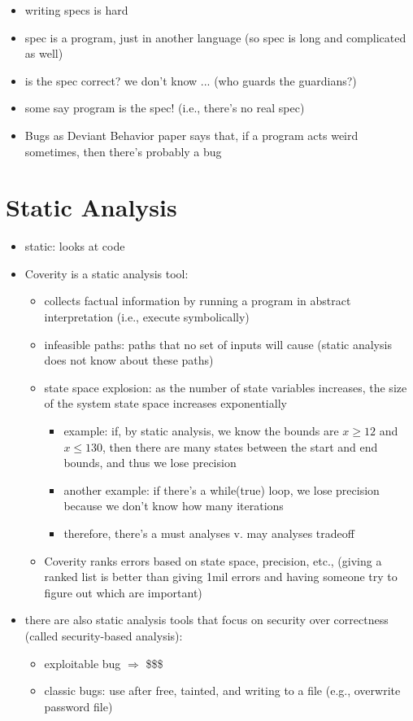 \documentclass[twoside]{article}
\begin{document}
\begin{itemize}
	\item writing specs is hard
	\item spec is a program, just in another language (so spec is long and complicated as well)
	\item is the spec correct? we don't know ... (who guards the guardians?)
	\item some say program is the spec! (i.e., there's no real spec)
	\item Bugs as Deviant Behavior paper says that, if a program acts weird sometimes, then there's probably a bug
\end{itemize}

\section{Static Analysis}

\begin{itemize}
	\item static: looks at code
	\item Coverity is a static analysis tool:
	\begin{itemize}
		\item collects factual information by running a program in abstract interpretation (i.e., execute symbolically)
		\item infeasible paths: paths that no set of inputs will cause (static analysis does not know about these paths)
		\item state space explosion: as the number of state variables increases, the size of the system state space increases exponentially
		\begin{itemize}
			\item example: if, by static analysis, we know the bounds are $x \geq 12$ and $x \leq 130$, then there are many states between the start and end bounds, and thus we lose precision
			\item another example: if there's a while(true) loop, we lose precision because we don't know how many iterations
			\item therefore, there's a must analyses v. may analyses tradeoff
		\end{itemize}
		\item Coverity ranks errors based on state space, precision, etc., (giving a ranked list is better than giving 1mil errors and having someone try to figure out which are important)
	\end{itemize}
	\item there are also static analysis tools that focus on security over correctness (called security-based analysis):
	\begin{itemize}
		\item exploitable bug $\Rightarrow$ \$\$\$
		\item classic bugs: use after free, tainted, and writing to a file (e.g., overwrite password file)
	\end{itemize}
\end{itemize}
\end{document}
